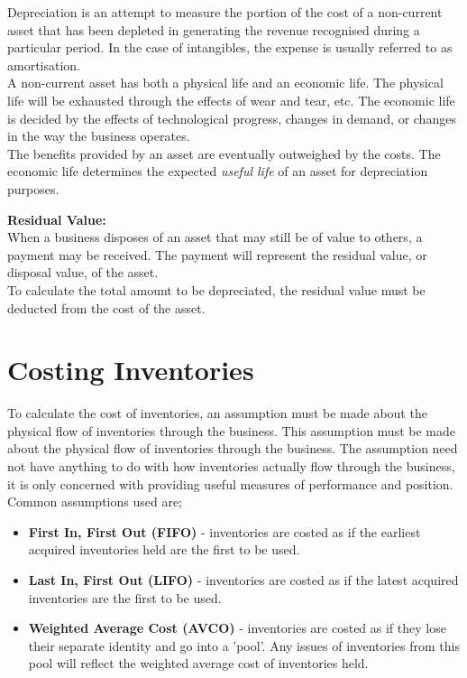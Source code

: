 \documentclass{report}
\newenvironment{blackbox}[1][Black]
  {\begin{tcolorbox}[colframe=#1,colback=white]}
  {\end{tcolorbox}}
\begin{document}
Depreciation is an attempt to measure the portion of the cost of a non-current asset that has been depleted in generating the revenue recognised during a particular period. In the case of intangibles, the expense is usually referred to as amortisation.\\

A non-current asset has both a physical life and an economic life. The physical life will be exhausted through the effects of wear and tear, etc. The economic life is decided by the effects of technological progress, changes in demand, or changes in the way the business operates.\\

The benefits provided by an asset are eventually outweighed by the costs. The economic life determines the expected \textit{useful life} of an asset for depreciation purposes. \\

\begin{blackbox}
    \textbf{Residual Value:}\\
    When a business disposes of an asset that may still be of value to others, a payment may be received. The payment will represent the residual value, or disposal value, of the asset.\\

    To calculate the total amount to be depreciated, the residual value must be deducted from the cost of the asset.
\end{blackbox}

\section{Costing Inventories}

To calculate the cost of inventories, an assumption must be made about the physical flow of inventories through the business. This assumption must be made about the physical flow of inventories through the business. The assumption need not have anything to do with how inventories actually flow through the business, it is only concerned with providing useful measures of performance and position. Common assumptions used are;
\begin{itemize}
    \item \textbf{First In, First Out (FIFO)} - inventories are costed as if the earliest acquired inventories held are the first to be used. 
    \item \textbf{Last In, First Out (LIFO)} - inventories are costed as if the latest acquired inventories are the first to be used.
    \item \textbf{Weighted Average Cost (AVCO)} - inventories are costed as if they lose their separate identity and go into a 'pool'. Any issues of inventories from this pool will reflect the weighted average cost of inventories held.
\end{itemize}
\end{document}
